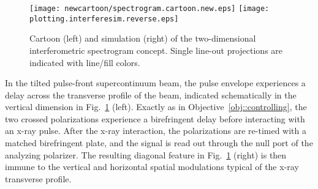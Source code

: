 \documentclass[letterpaper,oneside,11pt]{article}
\begin{document}
\begin{figure}
\centerline{	
	\texttt{[image: newcartoon/spectrogram.cartoon.new.eps]}
	\vrule
	\hspace{3mm}
	\texttt{[image: plotting.interferesim.reverse.eps]}
}
\vspace{-.5\baselineskip}
\caption{\label{2dinterferesim} Cartoon (left) and simulation (right) of the two-dimensional interferometric spectrogram concept.  Single line-out projections are indicated with line/fill colors.}
\end{figure}

In the tilted pulse-front supercontinuum beam, the pulse envelope experiences a delay across the transverse profile of the beam, indicated schematically in the vertical dimension in Fig.~\ref{2dinterferesim} (left).
Exactly as in Objective~\ref{obj::controlling}, the two crossed polarizations experience a birefringent delay before interacting with an x-ray pulse.
After the x-ray interaction, the polarizations are re-timed with a matched birefringent plate, and the signal is read out through the null port of the analyzing polarizer.
The resulting diagonal feature in Fig.~\ref{2dinterferesim} (right) is then immune to the vertical and horizontal spatial modulations typical of the x-ray transverse profile.
\end{document}
